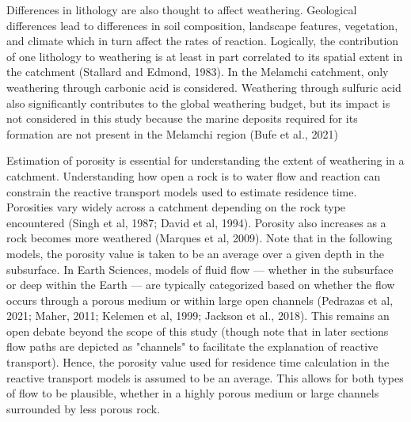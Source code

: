 \bsk

Differences in lithology are also thought to affect weathering. Geological differences lead to differences in soil composition, landscape features, vegetation, and climate which in turn affect the rates of reaction. Logically, the contribution of one lithology to weathering is at least in part correlated to its spatial extent in the catchment (Stallard and Edmond, 1983). In the Melamchi catchment, only weathering through carbonic acid is considered. Weathering through sulfuric acid also significantly contributes to the global weathering budget, but its impact is not considered in this study because the marine deposits required for its formation are not present in the Melamchi region (Bufe et al., 2021) 

\bsk

Estimation of porosity is essential for understanding the extent of weathering in a catchment. Understanding how open a rock is to water flow and reaction can constrain the reactive transport models used to estimate residence time. Porosities vary widely across a catchment depending on the rock type encountered (Singh et al, 1987; David et al, 1994). Porosity also increases as a rock becomes more weathered (Marques et al, 2009). Note that in the following models, the porosity value is taken to be an average over a given depth in the subsurface. In Earth Sciences, models of fluid flow — whether in the subsurface or deep within the Earth — are typically categorized based on whether the flow occurs through a porous medium or within large open channels (Pedrazas et al, 2021; Maher, 2011; Kelemen et al, 1999; Jackson et al., 2018). This remains an open debate beyond the scope of this study (though note that in later sections flow paths are depicted as "channels" to facilitate the explanation of reactive transport). Hence, the porosity value used for residence time calculation in the reactive transport models is assumed to be an average. This allows for both types of flow to be plausible, whether in a highly porous medium or large channels surrounded by less porous rock.

\bsk


